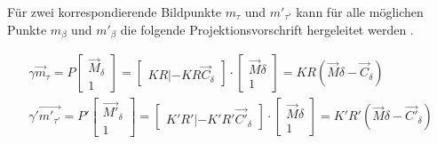 Für zwei korrespondierende Bildpunkte $m_\tau$ und $ m'_{\tau'}$ kann für alle möglichen Punkte $m_\beta$ und $m'_\beta$ die folgende Projektionsvorschrift hergeleitet werden \cite{Elements}.

\begin{gather}
	\gamma \vec{m}_\tau = P \begin{bmatrix}\vec{M}_\delta\\1\end{bmatrix} = 
	\begin{bmatrix}KR|-KR\vec{C}_\delta\end{bmatrix}\cdot \begin{bmatrix}\vec{M}\delta\\1\end{bmatrix} = KR(\vec{M}\delta - \vec{C}_\delta)\\
	\gamma' \vec{m'_{\tau'}} = P' \begin{bmatrix}\vec{M'}_\delta\\1\end{bmatrix} = 
	\begin{bmatrix}K'R'|-K'R'\vec{C'}_\delta\end{bmatrix}\cdot \begin{bmatrix}\vec{M}\delta\\1\end{bmatrix} = K'R'(\vec{M}\delta - \vec{C'}_\delta)\label{eq:Homo}
\end{gather}\\




